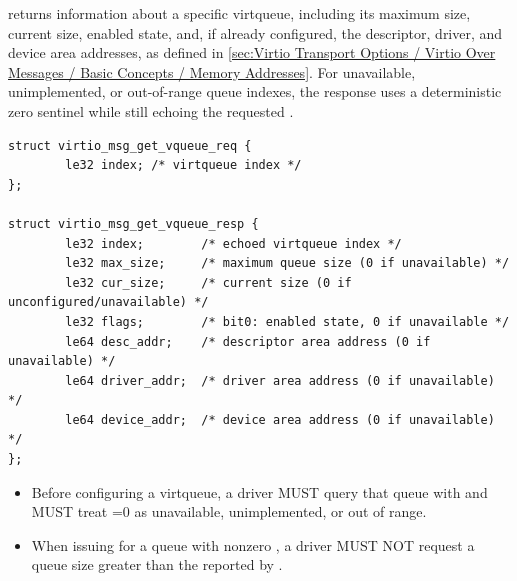 
 returns information about a specific virtqueue, including
its maximum size, current size, enabled state, and, if already configured, the
descriptor, driver, and device area addresses, as defined in
\ref{sec:Virtio Transport Options / Virtio Over Messages / Basic Concepts / Memory Addresses}.
For unavailable,
unimplemented, or out-of-range queue indexes, the response uses a
deterministic zero sentinel while still echoing the requested .

\begin{lstlisting}
struct virtio_msg_get_vqueue_req {
        le32 index; /* virtqueue index */
};

struct virtio_msg_get_vqueue_resp {
        le32 index;        /* echoed virtqueue index */
        le32 max_size;     /* maximum queue size (0 if unavailable) */
        le32 cur_size;     /* current size (0 if unconfigured/unavailable) */
        le32 flags;        /* bit0: enabled state, 0 if unavailable */
        le64 desc_addr;    /* descriptor area address (0 if unavailable) */
        le64 driver_addr;  /* driver area address (0 if unavailable) */
        le64 device_addr;  /* device area address (0 if unavailable) */
};
\end{lstlisting}

\begin{itemize}
  \item Before configuring a virtqueue, a driver MUST query that queue with
         and MUST treat =0 as unavailable,
        unimplemented, or out of range.
  \item When issuing  for a queue with nonzero
        , a driver MUST NOT request a queue size greater than
        the  reported by .
\end{itemize}

